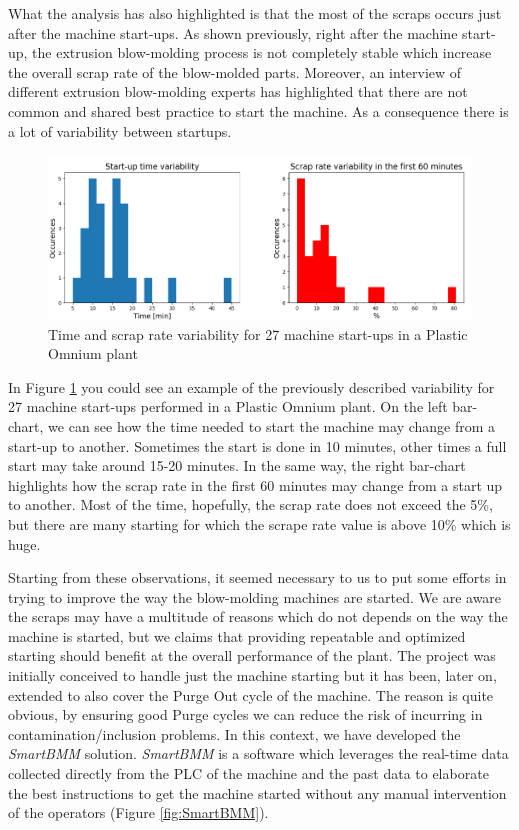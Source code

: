 What the analysis has also highlighted is that the most of the scraps occurs just after the machine start-ups. As shown previously, right after the machine start-up, the extrusion blow-molding process is not completely stable which increase the overall scrap rate of the blow-molded parts. Moreover, an interview of different extrusion blow-molding experts has highlighted that there are not common and shared best practice to start the machine. As a consequence there is a lot of variability between startups.

\begin{figure}
\centerline{\includegraphics[scale=0.7]{images/chapter_3/smartbmm_barchart.png}}
\caption{Time and scrap rate variability for 27 machine start-ups in a Plastic Omnium plant}
\label{fig:smartbmm_barchart}
\end{figure}

In Figure \ref{fig:smartbmm_barchart} you could see an example of the previously described variability for 27 machine start-ups performed in a Plastic Omnium plant. On the left bar-chart, we can see how the time needed to start the machine may change from a start-up to another. Sometimes the start is done in 10 minutes, other times a full start may take around 15-20 minutes. In the same way, the right bar-chart highlights how the scrap rate in the first 60 minutes may change from a start up to another. Most of the time, hopefully, the scrap rate does not exceed the 5\%, but there are many starting for which the scrape rate value is above 10\% which is huge. 

Starting from these observations, it seemed necessary to us to put some efforts in trying to improve the way the blow-molding machines are started. We are aware the scraps may have a multitude of reasons which do not depends on the way the machine is started, but we claims that providing repeatable and optimized starting should benefit at the overall performance of the plant. 
The project was initially conceived to handle just the machine starting but it has been, later on, extended to also cover the Purge Out cycle of the machine. The reason is quite obvious, by ensuring good Purge cycles we can reduce the risk of incurring in contamination/inclusion problems. In this context, we have developed the \textit{SmartBMM} solution. \textit{SmartBMM} is a software which leverages the real-time data collected directly from the PLC of the machine and the past data to elaborate the best instructions to get the machine started without any manual intervention of the operators (Figure \ref{fig:SmartBMM}).

